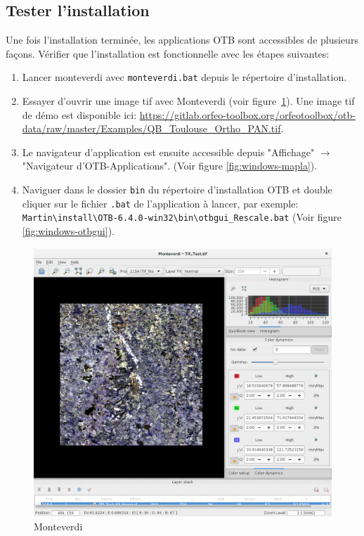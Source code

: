 \documentclass[10pt,a4paper]{article}
\begin{document}
\subsection{Tester l'installation}
Une fois l'installation terminée, les applications OTB sont accessibles de
plusieurs façons. Vérifier que l'installation est fonctionnelle avec les étapes
suivantes:
\begin{enumerate}

\item Lancer monteverdi avec \texttt{monteverdi.bat} depuis le répertoire
d'installation.

\item Essayer d'ouvrir une image tif avec Monteverdi (voir
figure~\ref{fig:monteverdi}). Une image tif de démo est
disponible ici: \url{https://gitlab.orfeo-toolbox.org/orfeotoolbox/otb-data/raw/master/Examples/QB\_Toulouse\_Ortho\_PAN.tif}.

\item Le navigateur d'application est ensuite accessible depuis "Affichage"
$\rightarrow$ "Navigateur d'OTB-Applications".
(Voir figure \ref{fig:windows-mapla}).

\item Naviguer dans le dossier \texttt{bin} du répertoire d'installation OTB et double cliquer sur le
fichier \texttt{.bat} de l'application à lancer, par exemple:\\
\texttt{Martin{\textbackslash}install{\textbackslash}OTB-6.4.0-win32{\textbackslash}bin{\textbackslash}otbgui\_Rescale.bat}
(Voir figure \ref{fig:windows-otbgui}).

\end{enumerate}

\begin{figure}[h]
  \center
  \includegraphics[width=1\textwidth]{Art/monteverdi-tif.png}
  \caption[]{Monteverdi}
  \label{fig:monteverdi}
\end{figure}
\end{document}
